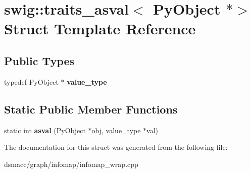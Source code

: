 \hypertarget{structswig_1_1traits__asval_3_01PyObject_01_5_4}{}\section{swig\+:\+:traits\+\_\+asval$<$ Py\+Object $\ast$$>$ Struct Template Reference}
\label{structswig_1_1traits__asval_3_01PyObject_01_5_4}
\subsection*{Public Types}
\begin{DoxyCompactItemize}
\item 
\mbox{\label{structswig_1_1traits__asval_3_01PyObject_01_5_4_a27a163991e96a33bcf1937a8ca435479}} 
typedef Py\+Object $\ast$ {\bfseries value\+\_\+type}
\end{DoxyCompactItemize}
\subsection*{Static Public Member Functions}
\begin{DoxyCompactItemize}
\item 
\mbox{\label{structswig_1_1traits__asval_3_01PyObject_01_5_4_aca155c255a1d5d8a00141cbc502f6197}} 
static int {\bfseries asval} (Py\+Object $\ast$obj, value\+\_\+type $\ast$val)
\end{DoxyCompactItemize}


The documentation for this struct was generated from the following file\+:\begin{DoxyCompactItemize}
\item 
dsmacc/graph/infomap/infomap\+\_\+wrap.\+cpp\end{DoxyCompactItemize}
